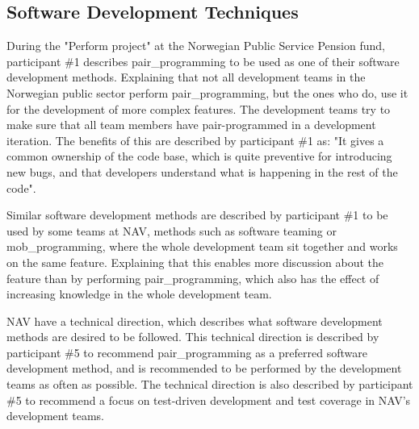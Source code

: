 \subsection{Software Development Techniques} \label{sec:software_development_techniques}
During the "Perform project" at the Norwegian Public Service Pension fund, participant \#1 describes \gls{pair_programming} to be used as one of their software development methods. Explaining that not all development teams in the Norwegian public sector perform \gls{pair_programming}, but the ones who do, use it for the development of more complex features. The development teams try to make sure that all team members have pair-programmed in a development iteration. The benefits of this are described by participant \#1 as: "It gives a common ownership of the code base, which is quite preventive for introducing new bugs, and that developers understand what is happening in the rest of the code".


Similar software development methods are described by participant \#1 to be used by some teams at NAV, methods such as software teaming or \gls{mob_programming}, where the whole development team sit together and works on the same feature. Explaining that this enables more discussion about the feature than by performing \gls{pair_programming}, which also has the effect of increasing knowledge in the whole development team.


NAV have a technical direction, which describes what software development methods are desired to be followed. This technical direction is described by participant \#5 to recommend \gls{pair_programming} as a preferred software development method, and is recommended to be performed by the development teams as often as possible. The technical direction is also described by participant \#5 to recommend a focus on test-driven development and test coverage in NAV's development teams. 

